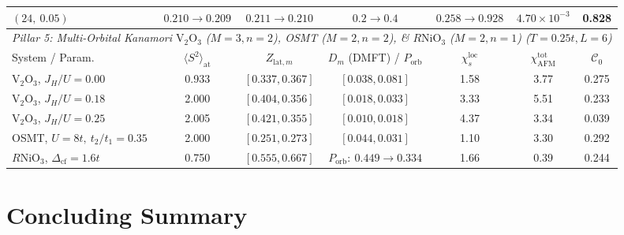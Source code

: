 \documentclass[11pt,a4paper]{article}
\numberwithin{equation}{section}
\theoremstyle{plain}
\theoremstyle{definition}
\begin{document}
\begin{table}[htbp]
{\begin{tabular}{lcccccc}
$(24,\ 0.05)$ & $0.210 \to 0.209$ & $0.211 \to 0.210$ & $0.2 \to 0.4$ & $0.258 \to 0.928$ & $4.70\times 10^{-3}$ & 0.828 \\
\midrule
\multicolumn{7}{c}{\textit{Pillar 5: Multi-Orbital Kanamori $\mathrm{V}_2\mathrm{O}_3$ ($M=3, n=2$), OSMT ($M=2, n=2$), \& $R\mathrm{NiO}_3$ ($M=2, n=1$) ($T=0.25t, L=6$)}} \\
System / Param. & $\langle S^2\rangle_{\mathrm{at}}$ & $Z_{\mathrm{lat},m}$ & $D_m$ (DMFT) / $P_{\mathrm{orb}}$ & $\chi_s^{\mathrm{loc}}$ & $\chi_{\mathrm{AFM}}^{\mathrm{tot}}$ & $\mathcal{C}_0$ \\
\midrule
$\mathrm{V}_2\mathrm{O}_3$, $J_H/U=0.00$ & 0.933 & $[0.337, 0.367]$ & $[0.038, 0.081]$ & 1.58 & 3.77 & 0.275 \\
$\mathrm{V}_2\mathrm{O}_3$, $J_H/U=0.18$ & 2.000 & $[0.404, 0.356]$ & $[0.018, 0.033]$ & 3.33 & 5.51 & 0.233 \\
$\mathrm{V}_2\mathrm{O}_3$, $J_H/U=0.25$ & 2.005 & $[0.421, 0.355]$ & $[0.010, 0.018]$ & 4.37 & 3.34 & 0.039 \\
OSMT, $U=8t,\ t_2/t_1=0.35$ & 2.000 & $[0.251, 0.273]$ & $[0.044, 0.031]$ & 1.10 & 3.30 & 0.292 \\
$R\mathrm{NiO}_3$, $\Delta_{\mathrm{cf}}=1.6t$ & 0.750 & $[0.555, 0.667]$ & $P_{\mathrm{orb}}:\ 0.449 \to 0.334$ & 1.66 & 0.39 & 0.244 \\
\bottomrule
\end{tabular}}
\end{table}


\clearpage
\section{Concluding Summary}
\label{sec:conclusion}
\end{document}
